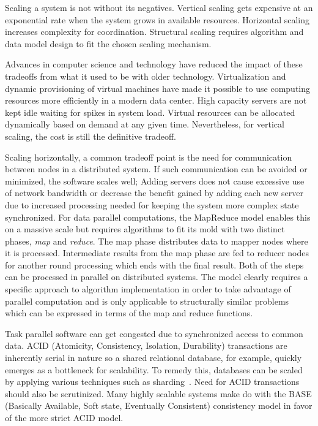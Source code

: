 \documentclass[english]{tktltiki2}
\theoremstyle{definition}
\theoremstyle{remark}
\begin{document}
Scaling a system is not without its negatives. Vertical scaling gets expensive
at an exponential rate when the system grows in available resources. Horizontal
scaling increases complexity for coordination. Structural scaling requires
algorithm and data model design to fit the chosen scaling mechanism.

Advances in computer science and technology have reduced the impact of these
tradeoffs from what it used to be with older technology. Virtualization and
dynamic provisioning of virtual machines have made it possible to use computing
resources more efficiently in a modern data center. High capacity servers are
not kept idle waiting for spikes in system load. Virtual resources can be
allocated dynamically based on demand at any given time. Nevertheless, for
vertical scaling, the cost is still the definitive tradeoff.

Scaling horizontally, a common tradeoff point is the need for communication
between nodes in a distributed system. If such communication can be avoided or
minimized, the software scales well; Adding servers does not cause excessive use
of network bandwidth or decrease the benefit gained by adding each new server
due to increased processing needed for keeping the system more complex state
synchronized. For data parallel computations, the MapReduce model enables this on a massive
scale but requires algorithms to fit its mold with two distinct phases,
\emph{map} and \emph{reduce}. The map phase distributes data to mapper nodes
where it is processed. Intermediate results from the map phase are fed to
reducer nodes for another round processing which ends with the final result.
Both of the steps can be processed in parallel on distributed systems. The model
clearly requires a specific approach to algorithm implementation in order to
take advantage of parallel computation and is only applicable to structurally
similar problems which can be expressed in terms of the map and reduce
functions.

Task parallel software can get congested due to synchronized access to common
data. ACID (Atomicity, Consistency, Isolation, Durability) transactions are
inherently serial in nature so a shared relational database, for example,
quickly emerges as a bottleneck for scalability. To remedy this, databases can
be scaled by applying various techniques such as
sharding~\cite{introToSharding}. Need for ACID transactions should also be
scrutinized. Many highly scalable systems make do with the BASE (Basically
Available, Soft state, Eventually Consistent) consistency model in favor of the
more strict ACID model.
\end{document}
